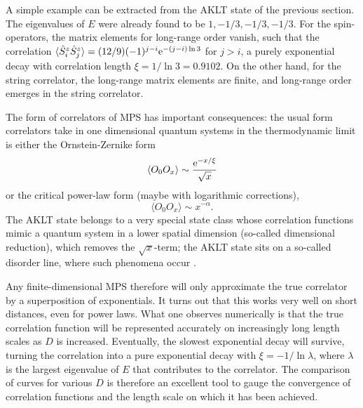 \documentclass[a4paper,10pt,oneside,onecolumn,1p,times]{elsarticle}
\newcommand{\eul}{{\rm e }}
\begin{document}
A simple example can be extracted from the AKLT state of the previous section. The eigenvalues of $E$ were already found to be $1,-1/3,-1/3,-1/3$.  For the spin-operators, the matrix elements for long-range order vanish, such that the correlation $\langle \hat{S}_i^z \hat{S}_j^z \rangle = (12/9)(-1)^{j-i} \eul^{-(j-i)\ln 3}$ for $j>i$, a purely exponential decay with correlation length $\xi = 1/\ln 3= 0.9102$. On the other hand, for the string correlator, the long-range matrix elements are finite, and long-range order emerges in the string correlator.

The form of correlators of MPS has important consequences: the usual form correlators take in one dimensional quantum systems in the thermodynamic limit is either the Ornstein-Zernike form
\begin{equation}
\langle O_0 O_x \rangle \sim \frac{\eul^{-x/\xi}}{\sqrt{x}}
\end{equation}
or the critical power-law form (maybe with logarithmic corrections),
\begin{equation}
\langle O_0 O_x \rangle \sim x^{-\alpha} .
\end{equation}
The AKLT state belongs to a very special state class whose correlation functions mimic a quantum system in a lower spatial dimension (so-called dimensional reduction), which removes the $\sqrt{x}$-term; the AKLT state sits on a so-called disorder line, where such phenomena occur \cite{Garel96}. 

Any finite-dimensional MPS therefore will only approximate the true correlator by a superposition of exponentials. It turns out that this works very well on short distances, even for power laws. What one observes numerically is that the true correlation function will be represented accurately on increasingly long length scales as $D$ is increased. Eventually, the slowest exponential decay will survive, turning the correlation into a pure exponential decay with $\xi =  -1/\ln \lambda$, where $\lambda$ is the largest eigenvalue of $E$ that contributes to the correlator. The comparison of curves for various $D$ is therefore an excellent tool to gauge the convergence of correlation functions and the length scale on which it has been achieved.  
\end{document}
